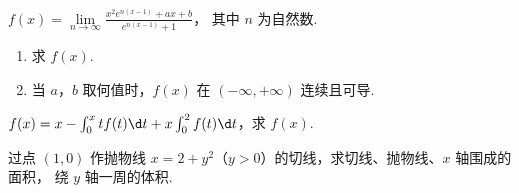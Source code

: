 \documentclass[quiet]{ctexart}
\begin{document}
\begin{problem}
  $ f(x) = \lim\limits_{n \to \infty}
    \frac{x^2 e^{n(x - 1)} + ax + b}{e^{n(x - 1)} + 1}$，
  其中 $n$ 为自然数.
  \begin{enumerate}
    \item 求 $f(x)$.
    \item 当 $a$，$b$ 取何值时，$f(x)$ 在 $(-\infty,+\infty)$ 连续且可导.
  \end{enumerate}
\end{problem}
\begin{solution}
  
\end{solution}

\begin{problem}
  $f(x) = x - \int_0^x tf(t) \d t + x\int_0^2 f(t) \d t$，求 $f(x)$.
\end{problem}
\begin{solution}
  
\end{solution}

\begin{problem}
  过点 $(1,0)$ 作抛物线 $x = 2 + y^2$（$y > 0$）的切线，求切线、抛物线、$x$ 轴围成的面积，
  绕 $y$ 轴一周的体积.
\end{problem}
\begin{solution}
  
\end{solution}
\end{document}

